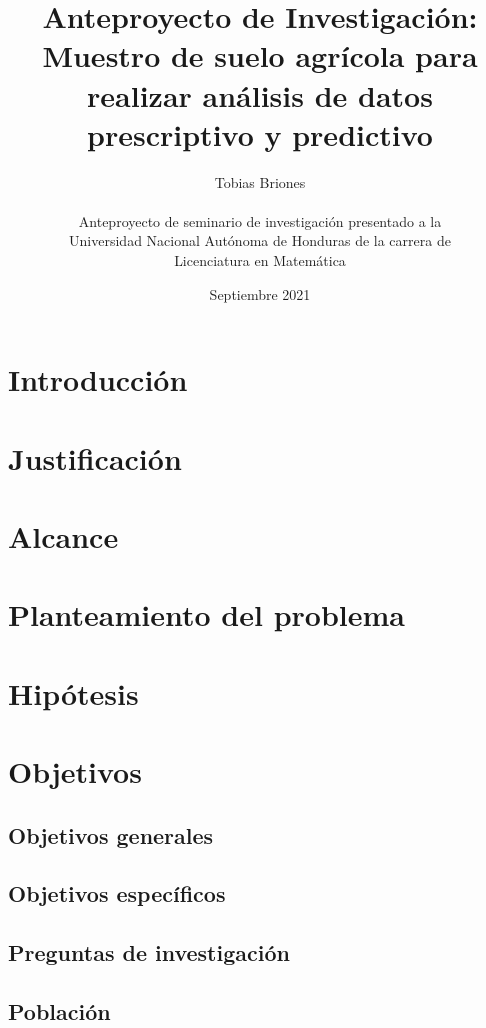 \documentclass{report}
\title{Anteproyecto de Investigación: Muestro de suelo agrícola para realizar análisis de datos prescriptivo y predictivo}
\author{
Tobias Briones\\\\
Anteproyecto de seminario de investigación presentado a la\\
Universidad Nacional Autónoma de Honduras de la carrera de\\
Licenciatura en Matemática
}
\date{Septiembre 2021}
\begin{document}
\maketitle

\tableofcontents


\section{Introducción}


\section{Justificación}


\section{Alcance}

\section{Planteamiento del problema}


\section{Hipótesis}


\section{Objetivos}


\subsection{Objetivos generales}


\subsection{Objetivos específicos}



\subsection{Preguntas de investigación}


\subsection{Población}
\end{document}
